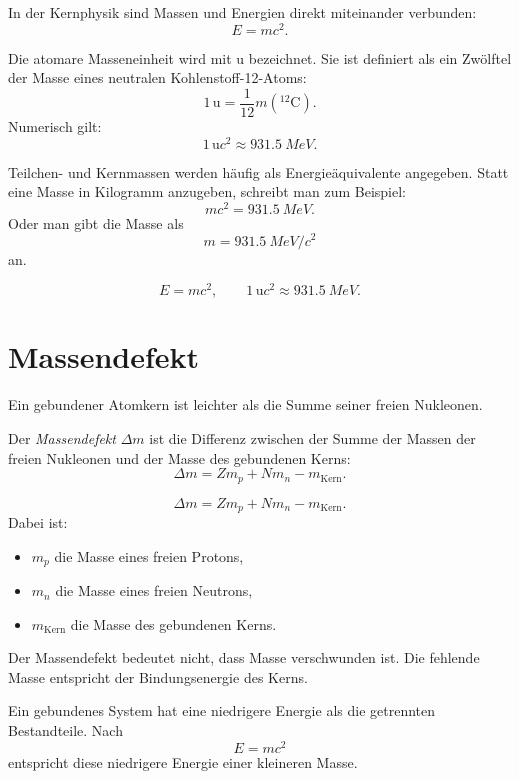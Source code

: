 In der Kernphysik sind Massen und Energien direkt miteinander verbunden:
\[
    E = mc^2.
\]

\begin{definitionbox}
Die atomare Masseneinheit wird mit $\mathrm{u}$ bezeichnet.
Sie ist definiert als ein Zwölftel der Masse eines neutralen Kohlenstoff-12-Atoms:
\[
    1\,\mathrm{u} = \frac{1}{12}m({}^{12}\mathrm{C}).
\]
Numerisch gilt:
\[
    1\,\mathrm{u}c^2 \approx \SI{931.5}{MeV}.
\]
\end{definitionbox}

\begin{conceptbox}
Teilchen- und Kernmassen werden häufig als Energieäquivalente angegeben.
Statt eine Masse in Kilogramm anzugeben, schreibt man zum Beispiel:
\[
    m c^2 = \SI{931.5}{MeV}.
\]
Oder man gibt die Masse als
\[
    m = \SI{931.5}{MeV}/c^2
\]
an.
\end{conceptbox}

\begin{formulabox}
\[
    E = mc^2,
    \qquad
    1\,\mathrm{u}c^2 \approx \SI{931.5}{MeV}.
\]
\end{formulabox}

\section{Massendefekt}

Ein gebundener Atomkern ist leichter als die Summe seiner freien Nukleonen.

\begin{definitionbox}
Der \emph{Massendefekt} $\Delta m$ ist die Differenz zwischen der Summe der
Massen der freien Nukleonen und der Masse des gebundenen Kerns:
\[
    \Delta m = Zm_p + Nm_n - m_{\mathrm{Kern}}.
\]
\end{definitionbox}

\begin{formulabox}
\[
    \Delta m = Zm_p + Nm_n - m_{\mathrm{Kern}}.
\]
Dabei ist:
\begin{itemize}
    \item $m_p$ die Masse eines freien Protons,
    \item $m_n$ die Masse eines freien Neutrons,
    \item $m_{\mathrm{Kern}}$ die Masse des gebundenen Kerns.
\end{itemize}
\end{formulabox}

\begin{conceptbox}
Der Massendefekt bedeutet nicht, dass Masse verschwunden ist.
Die fehlende Masse entspricht der Bindungsenergie des Kerns.

Ein gebundenes System hat eine niedrigere Energie als die getrennten Bestandteile.
Nach
\[
    E=mc^2
\]
entspricht diese niedrigere Energie einer kleineren Masse.
\end{conceptbox}


